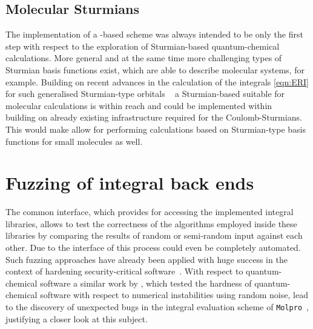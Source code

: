 \subsection{Molecular Sturmians}
\label{sec:MolecularSturmian}
The implementation of a \CS-based \SCF scheme was always intended
to be only the first step with respect to the exploration
of Sturmian-based quantum-chemical calculations.
More general and at the same time more challenging types of Sturmian basis
functions exist,
which are able to describe molecular systems, for example.
Building on recent advances in the calculation of the \ERI integrals
\eqref{eqn:ERI} for such generalised Sturmian-type orbitals%
~\cite{Avery2006,Avery2011PhD,Avery2011,Morales2016,Avery2017,Randazzo2015,Granados2016}
a Sturmian-based \HF suitable for molecular calculations is within reach
and could be implemented within \sturmint~\cite{sturmintWeb}
building on already existing infrastructure required for the Coulomb-Sturmians.
This would make allow for performing calculations
based on Sturmian-type basis functions for small molecules as well.


%
%
\section{Fuzzing of integral back ends}
\label{sec:Fuzzing}
The common interface, which \molsturm provides
for accessing the implemented integral libraries,
allows to test the correctness
of the algorithms employed inside these libraries
by comparing the results of
random or semi-random input against each other.
Due to the \python interface of \molsturm this process could
even be completely automated.
Such fuzzing approaches have already been applied with huge success
in the context of hardening security-critical software~\cite{Fuzzing}.
With respect to quantum-chemical software
a similar work by \citet{Knizia2011},
which tested the hardness of quantum-chemical software
with respect to numerical instabilities using random noise,
lead to the discovery of unexpected bugs
in the integral evaluation scheme of \texttt{Molpro}~\cite{Molpro},
justifying a closer look at this subject.
